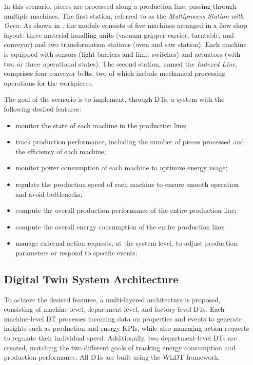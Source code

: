 In this scenario, pieces are processed along a production line, passing through multiple machines.
%
The first station, referred to as the \textit{Multiprocess Station with Oven}.
As shown in , the module consists of five machines arranged in a flow shop layout: 
three material handling units (vacuum gripper carrier, turntable, and conveyor)
and two transformation stations (oven and saw station).
%
Each machine is equipped with sensors (light barriers and limit switches) and actuators (with two or three operational states).
%
The second station, named the \textit{Indexed Line}, comprises four conveyor belts, two of which include mechanical processing operations for the workpieces.

The goal of the scenario is to implement, through \acp{DT}, a system with the following desired features: 
\begin{itemize}
    \item monitor the state of each machine in the production line;
    \item track production performance, including the number of pieces processed and the efficiency of each machine;
    \item monitor power consumption of each machine to optimize energy usage;
    \item regulate the production speed of each machine to ensure smooth operation and avoid bottlenecks;
    \item compute the overall production performance of the entire production line;
    \item compute the overall energy consumption of the entire production line;
    \item manage external action requests, at the system level, to adjust production parameters or respond to specific events;
\end{itemize} 

\subsection{Digital Twin System Architecture}

To achieve the desired features, a multi-layered architecture is proposed, consisting of machine-level, department-level, and factory-level \acp{DT}.
%
Each machine-level \ac{DT} processes incoming data on properties and events to generate insights such as production and energy KPIs, while also managing action requests to regulate their individual speed.
%
Additionally, two department-level \acp{DT} are created, matching the two different goals of tracking energy consumption and production performance.
%
All \acp{DT} are built using the \ac{WLDT} framework.

